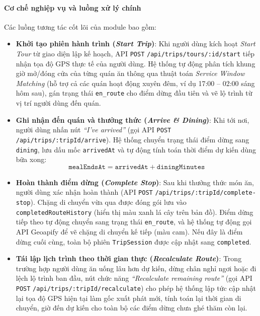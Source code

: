 \paragraph{Cơ chế nghiệp vụ và luồng xử lý chính}
Các luồng tương tác cốt lõi của module bao gồm:
\begin{itemize}[label=\textbullet]
    \item \textbf{Khởi tạo phiên hành trình (\textit{Start Trip})}: Khi người dùng kích hoạt \textit{Start Tour} từ giao diện lập kế hoạch, API \texttt{POST} \texttt{/api/trips/tours/:id/start} tiếp nhận tọa độ GPS thực tế của người dùng. Hệ thống tự động phân tích khung giờ mở/đóng cửa của từng quán ăn thông qua thuật toán \textit{Service Window Matching} (hỗ trợ cả các quán hoạt động xuyên đêm, ví dụ 17:00 -- 02:00 sáng hôm sau), gán trạng thái \texttt{en\_route} cho điểm dừng đầu tiên và vẽ lộ trình từ vị trí người dùng đến quán.
    \item \textbf{Ghi nhận đến quán và thưởng thức (\textit{Arrive \& Dining})}: Khi tới nơi, người dùng nhấn nút \textit{``I've arrived''} (gọi API \texttt{POST} \texttt{/api/trips/:tripId/arrive}). Hệ thống chuyển trạng thái điểm dừng sang \texttt{dining}, lưu dấu mốc \texttt{arrivedAt} và tự động tính toán thời điểm dự kiến dùng bữa xong:
    \begin{equation*}
        \texttt{mealEndsAt} = \texttt{arrivedAt} + \texttt{diningMinutes}
    \end{equation*}
    \item \textbf{Hoàn thành điểm dừng (\textit{Complete Stop})}: Sau khi thưởng thức món ăn, người dùng xác nhận hoàn thành (API \texttt{POST} \texttt{/api/trips/:tripId/complete-stop}). Chặng di chuyển vừa qua được đóng gói lưu vào \texttt{completedRouteHistory} (hiển thị màu xanh lá cây trên bản đồ). Điểm dừng tiếp theo tự động chuyển sang trạng thái \texttt{en\_route}, và hệ thống tự động gọi API Geoapify để vẽ chặng di chuyển kế tiếp (màu cam). Nếu đây là điểm dừng cuối cùng, toàn bộ phiên \texttt{TripSession} được cập nhật sang \texttt{completed}.
    \item \textbf{Tái lập lịch trình theo thời gian thực (\textit{Recalculate Route})}: Trong trường hợp người dùng ăn uống lâu hơn dự kiến, dừng chân nghỉ ngơi hoặc đi lệch lộ trình ban đầu, nút chức năng \textit{``Recalculate remaining route''} (gọi API \texttt{POST} \texttt{/api/trips/:tripId/recalculate}) cho phép hệ thống lập tức cập nhật lại tọa độ GPS hiện tại làm gốc xuất phát mới, tính toán lại thời gian di chuyển, giờ đến dự kiến cho toàn bộ các điểm dừng chưa ghé thăm còn lại.
\end{itemize}

